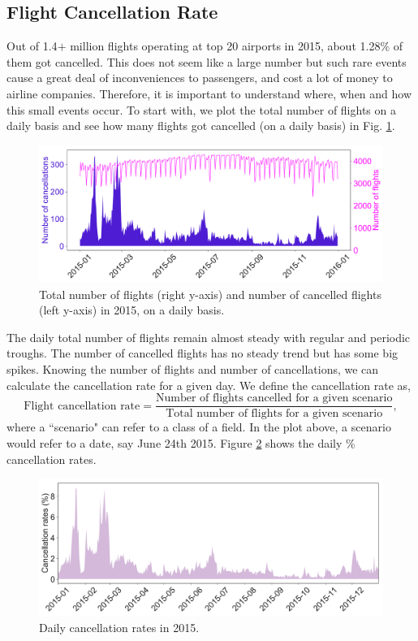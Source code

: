 \documentclass[12pt]{article}
\begin{document}
\subsection{Flight Cancellation Rate}
\label{subsec:canrate}
Out of 1.4$+$ million flights operating at top 20 airports in 2015, about 1.28$\%$ of them got cancelled. This does not seem like a large number but such rare events cause a great deal of inconveniences to passengers, and cost a lot of money to airline companies. Therefore, it is important to understand where, when and how this small events occur. To start with, we plot the total number of flights on a daily basis and see how many flights got cancelled (on a daily basis) in Fig. \ref{fig:daily}. 
\begin{figure}[h!]
\begin{center}
\includegraphics[width=6in]{daily_flights_cancellations.pdf}
\end{center}
\caption{\label{fig:daily}
Total number of flights (right y-axis) and number of cancelled flights (left y-axis) in 2015, on a daily basis.}
\end{figure}
The daily total number of flights remain almost steady with regular and periodic troughs. The number of cancelled flights has no steady trend but has some big spikes. Knowing the number of flights and number of cancellations, we can calculate the cancellation rate for a given day. We define the cancellation rate as, 
\begin{equation}
\label{eq:canrate}
\text{Flight cancellation rate} = \frac{\text{Number of flights cancelled for a given scenario}}{\text{Total number of flights for a given scenario}},
\end{equation}
where a ``scenario" can refer to a class of a field. In the plot above, a scenario would refer to a date, say June 24th 2015. Figure \ref{fig:dailycanrate} shows the daily $\%$ cancellation rates.  
\begin{figure}[h!]
\begin{center}
\includegraphics[width=6in]{daily_canrate.pdf}
\end{center}
\caption{\label{fig:dailycanrate}
Daily cancellation rates in 2015.}
\end{figure}
\end{document}
